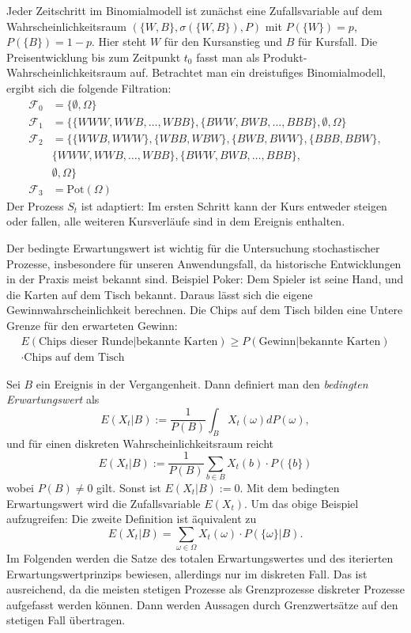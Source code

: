 \begin{bsp}
Jeder Zeitschritt im Binomialmodell ist zunächst eine Zufallsvariable auf dem 
Wahrscheinlichkeitsraum $(\{W, B\}, \sigma(\{W, B\}), P)$ mit 
$P(\{W \}) = p$, $P(\{B \}) = 1-p$. Hier steht $W$ für den Kursanstieg und $B$ für Kursfall. Die Preisentwicklung bis zum Zeitpunkt $t_0$ fasst man als Produkt-Wahrscheinlichkeitsraum auf.
Betrachtet man ein dreistufiges Binomialmodell, ergibt sich die folgende Filtration: 
$$
\begin{aligned}
\mathcal F_0 &= \{\emptyset, \Omega\} \\
\mathcal F_1 &= \{\{WWW, WWB, \dots, WBB \}, \{ BWW, BWB, \dots, BBB \},\emptyset, \Omega \} \\ 
\mathcal F_2 &= \{ \{WWB, WWW \}, \{WBB, WBW \}, \{BWB, BWW \}, \{BBB, BBW \}, \\ &\{WWW, WWB, \dots, WBB \}, \{ BWW, BWB, \dots, BBB \}, \\ &\emptyset, \Omega \} \\
\mathcal F_3 &= \text{Pot}(\Omega)
\end{aligned}
$$
Der Prozess $S_t$ ist adaptiert: Im ersten Schritt kann der Kurs entweder steigen oder
fallen, alle weiteren Kursverläufe sind in dem Ereignis enthalten.

\end{bsp}

\begin{defi}

Der bedingte Erwartungswert ist wichtig für die Untersuchung stochastischer Prozesse,
insbesondere für unseren Anwendungsfall, da historische Entwicklungen in der Praxis 
meist bekannt sind. Beispiel Poker: Dem Spieler ist seine Hand, und die Karten auf dem 
Tisch bekannt. Daraus lässt sich die eigene Gewinnwahrscheinlichkeit berechnen. Die Chips auf
dem Tisch bilden eine Untere Grenze für den erwarteten Gewinn:
$$
\begin{aligned}
E(\text{Chips dieser Runde}|\text{bekannte Karten}) \ge P(\text{Gewinn}|\text{bekannte Karten}) 
\\ \cdot \text{Chips auf dem Tisch}
\end{aligned}
$$

Sei $B$ ein Ereignis in der Vergangenheit. Dann definiert man
den \textit{bedingten Erwartungswert} als $$E(X_t|B):=  \frac{1}{P(B)} \int_{B}^{} X_t(\omega) dP(\omega),$$
und für einen diskreten Wahrscheinlichkeitsraum reicht
$$E(X_t|B):= \frac{1}{P(B)}\sum_{b \in B} X_t(b) \cdot P(\{ b \})$$
wobei $P(B) \neq 0$ gilt. Sonst ist $E(X_t|B) :=0$. 
Mit dem bedingten Erwartungswert wird die Zufallsvariable $E(X_t)$.
Um das obige Beispiel aufzugreifen: Die zweite Definition ist äquivalent zu
$$
E(X_t|B) = \sum_{\omega \in \Omega} X_t(\omega) \cdot P(\{\omega\}|B).
$$
Im Folgenden werden die Satze des totalen Erwartungswertes und des iterierten Erwartungswertprinzips bewiesen,
allerdings nur im diskreten Fall. Das ist ausreichend, da die meisten stetigen 
Prozesse als Grenzprozesse diskreter Prozesse aufgefasst werden können.
Dann werden Aussagen durch Grenzwertsätze auf den stetigen Fall übertragen. 

\end{defi}

